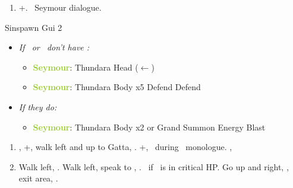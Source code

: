 \begin{enumerate}[resume]
  \item \cs+\skippablefmv[2:20]. \sd\ Seymour dialogue.
\end{enumerate}
\begin{battle}[6000]{Sinspawn Gui 2}
  \begin{itemize}
  \item \textit{If \yuna\ or \valefor\ don't have \od:}
  \begin{itemize}
    \item \textbf{\textcolor{YellowGreen}{Seymour}}: Thundara Head ($\leftarrow$)
    \item \textbf{\textcolor{YellowGreen}{Seymour}}: Thundara Body x5
          \yunaf Defend
          \auronf Defend
          \end{itemize}
	\item \textit{If they do:}
	\begin{itemize}
	    \item \textbf{\textcolor{YellowGreen}{Seymour}}: Thundara Body x2
	    \summon{\valefor} or Grand Summon \valefor
	    \valeforf Energy Blast
	 \end{itemize}
  \end{itemize}
\end{battle}
\begin{enumerate}[resume]
  \item \sd, \cs+\skippablefmv[2:00], walk left and up to Gatta, \sd. \fmv+\cs[1:30], \sd\ during \tidus\ monologue. \cs[1:00], \sd
  \item Walk left, \sd. Walk left, speak to \auron, \sd. \save\ if \auron\ is in critical HP. Go up and right, \sd, exit area, \sd.
\end{enumerate}
\vfill
\ 
\columnbreak

